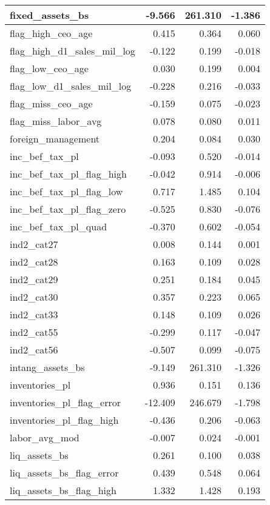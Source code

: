 \begin{table}
\begin{tabular}[t]{l|r|r|r}
\hline
fixed\_assets\_bs & -9.566 & 261.310 & -1.386\\
\hline
flag\_high\_ceo\_age & 0.415 & 0.364 & 0.060\\
\hline
flag\_high\_d1\_sales\_mil\_log & -0.122 & 0.199 & -0.018\\
\hline
flag\_low\_ceo\_age & 0.030 & 0.199 & 0.004\\
\hline
flag\_low\_d1\_sales\_mil\_log & -0.228 & 0.216 & -0.033\\
\hline
flag\_miss\_ceo\_age & -0.159 & 0.075 & -0.023\\
\hline
flag\_miss\_labor\_avg & 0.078 & 0.080 & 0.011\\
\hline
foreign\_management & 0.204 & 0.084 & 0.030\\
\hline
inc\_bef\_tax\_pl & -0.093 & 0.520 & -0.014\\
\hline
inc\_bef\_tax\_pl\_flag\_high & -0.042 & 0.914 & -0.006\\
\hline
inc\_bef\_tax\_pl\_flag\_low & 0.717 & 1.485 & 0.104\\
\hline
inc\_bef\_tax\_pl\_flag\_zero & -0.525 & 0.830 & -0.076\\
\hline
inc\_bef\_tax\_pl\_quad & -0.370 & 0.602 & -0.054\\
\hline
ind2\_cat27 & 0.008 & 0.144 & 0.001\\
\hline
ind2\_cat28 & 0.163 & 0.109 & 0.028\\
\hline
ind2\_cat29 & 0.251 & 0.184 & 0.045\\
\hline
ind2\_cat30 & 0.357 & 0.223 & 0.065\\
\hline
ind2\_cat33 & 0.148 & 0.109 & 0.026\\
\hline
ind2\_cat55 & -0.299 & 0.117 & -0.047\\
\hline
ind2\_cat56 & -0.507 & 0.099 & -0.075\\
\hline
intang\_assets\_bs & -9.149 & 261.310 & -1.326\\
\hline
inventories\_pl & 0.936 & 0.151 & 0.136\\
\hline
inventories\_pl\_flag\_error & -12.409 & 246.679 & -1.798\\
\hline
inventories\_pl\_flag\_high & -0.436 & 0.206 & -0.063\\
\hline
labor\_avg\_mod & -0.007 & 0.024 & -0.001\\
\hline
liq\_assets\_bs & 0.261 & 0.100 & 0.038\\
\hline
liq\_assets\_bs\_flag\_error & 0.439 & 0.548 & 0.064\\
\hline
liq\_assets\_bs\_flag\_high & 1.332 & 1.428 & 0.193\\

\end{tabular}
\end{table}

